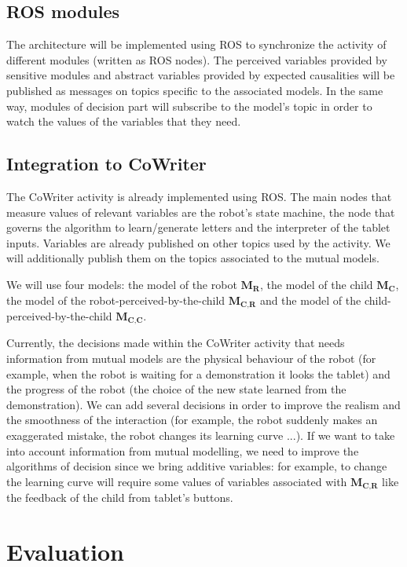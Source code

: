 \documentclass[10pt,a4paper]{article}
\begin{document}
\subsection{ROS modules}

The architecture will be implemented using ROS to synchronize the activity of different modules (written as ROS nodes). The perceived variables provided by sensitive modules and abstract variables provided by expected causalities will be published as messages on topics specific to the associated models. In the same way, modules of decision part will subscribe to the model's topic in order to watch the values of the variables that they need. 

\subsection{Integration to CoWriter}

The CoWriter activity is already implemented using ROS. The main nodes that measure values of relevant variables are the robot's state machine, the node that governs the algorithm to learn/generate letters and the interpreter of the tablet inputs. Variables are already published on other topics used by the activity. We will additionally publish them on the topics associated to the mutual models. 

We will use four models: the model of the robot $\textbf{M}_\textbf{R}$, the model of the child $\textbf{M}_\textbf{C}$, the model of the robot-perceived-by-the-child $\textbf{M}_\textbf{C,R}$ and the model of the child-perceived-by-the-child $\textbf{M}_\textbf{C,C}$.

Currently, the decisions made within the CoWriter activity that needs information from mutual models are the physical behaviour of the robot (for example, when the robot is waiting for a demonstration it looks the tablet) and the progress of the robot (the choice of the new state learned from the demonstration). We can add several decisions in order to improve the realism and the smoothness of the interaction (for example, the robot suddenly makes an exaggerated mistake, the robot changes its learning curve ...). If we want to take into account information from mutual modelling, we need to improve the algorithms of decision since we bring additive variables: for example, to change the learning curve will require some values of variables associated with $\textbf{M}_\textbf{C,R}$ like the feedback of the child from tablet's buttons.

\section{Evaluation}
\end{document}
